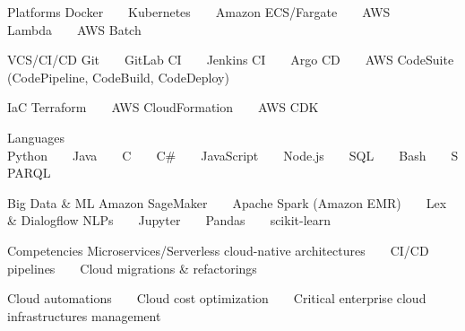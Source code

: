 

\begin{cvskills}

\cvskill
{Platforms} %
{Docker~~\textbullet~~Kubernetes~~\textbullet~~Amazon ECS/Fargate~~\textbullet~~AWS Lambda~~\textbullet~~AWS Batch} %


\cvskill
{VCS/CI/CD}%
{Git~~\textbullet~~GitLab CI~~\textbullet~~Jenkins CI~~\textbullet~~Argo CD~~\textbullet~~AWS CodeSuite (CodePipeline, CodeBuild, CodeDeploy)} %


\cvskill
{IaC} %
{Terraform~~\textbullet~~AWS CloudFormation~~\textbullet~~AWS CDK} %


  \cvskill
    {Languages} %
    {Python~~\textbullet~~Java~~\textbullet~~C~~\textbullet~~C\#~~\textbullet~~JavaScript~~\textbullet~~Node.js~~\textbullet~~SQL~~\textbullet~~Bash~~\textbullet~~SPARQL} %

\cvskill
{Big Data \& ML} %
{Amazon SageMaker~~\textbullet~~Apache Spark (Amazon EMR)~~\textbullet~~Lex \& Dialogflow NLPs~~\textbullet~~Jupyter~~\textbullet~~Pandas~~\textbullet~~scikit-learn} %

  \cvskill
{Competencies} %
{Microservices/Serverless cloud-native architectures~~\textbullet~~CI/CD pipelines~~\textbullet~~Cloud migrations \& refactorings~~\textbullet~~}

  \cvskill
  {}
  {Cloud automations~~\textbullet~~Cloud cost optimization~~\textbullet~~Critical enterprise cloud infrastructures management~~\textbullet~~} %


\end{cvskills}
